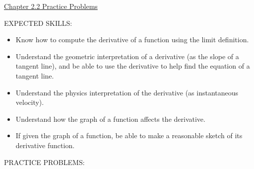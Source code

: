 \documentclass[12pt]{article}
\begin{document}
\begin{center}
\underline{\LARGE{Chapter 2.2 Practice Problems}}
\end{center}

\noindent EXPECTED SKILLS:

\begin{itemize}

\item Know how to compute the derivative of a function using the limit definition.

\item Understand the geometric interpretation of a derivative (as the slope of a tangent line), and be able to use the derivative to help find the equation of a tangent line.

\item Understand the physics interpretation of the derivative (as  instantaneous velocity).

\item Understand how the graph of a function affects the derivative.

\item If given the graph of a function, be able to make a reasonable sketch of its derivative function.

\end{itemize}

\noindent PRACTICE PROBLEMS:

\medskip
\end{document}
